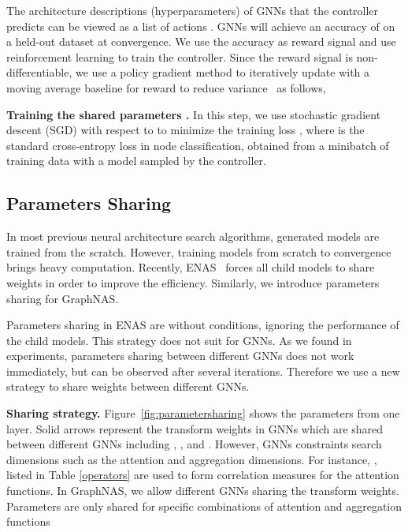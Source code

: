 \documentclass{article}
\begin{document}
The architecture descriptions (hyperparameters) of GNNs that the controller predicts can be viewed as a list of actions . GNNs will achieve an accuracy of  on a held-out dataset at convergence. We use the accuracy  as reward signal and use reinforcement learning to train the controller. Since the reward signal  is non-differentiable, we use a policy gradient method to iteratively update  with a moving average baseline for reward to reduce variance~\cite{Williams1992Simple} as follows, 
\begin{small}
	
\end{small}

\textbf{Training the shared parameters .}
In this step, we use stochastic gradient descent (SGD) with respect to  to minimize the training loss , where    is the standard cross-entropy loss in node classification, obtained from a minibatch of training data with a model  sampled by the controller.

\subsection{Parameters Sharing}
In most previous neural architecture search algorithms, generated models are trained from the scratch. However, training  models from scratch to convergence brings heavy computation. Recently, ENAS~\cite{ENAS} forces all child models to share weights in order to improve the efficiency.  Similarly, we introduce parameters sharing for GraphNAS.

Parameters sharing in ENAS are without conditions, ignoring the performance of the child models. This strategy does not suit for GNNs. As we found in experiments, parameters sharing between different GNNs does not work immediately, but can be observed after several iterations. Therefore we use a new strategy to share weights between different GNNs. 

\textbf{Sharing strategy.} Figure~\ref{fig:parametersharing} shows the parameters from one layer. Solid arrows represent the transform weights in GNNs which are shared between different GNNs including , ,  and . However, GNNs constraints search dimensions such as the attention and aggregation dimensions. For instance, ,  listed in Table \ref{operators} are used to form correlation measures for the  attention functions. 
In GraphNAS, we allow different GNNs sharing the transform weights. Parameters are only shared for specific combinations of attention and aggregation functions
\end{document}
